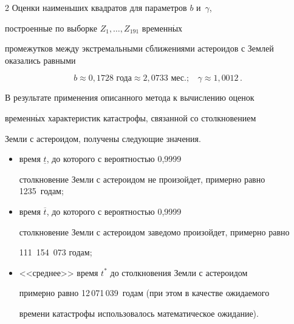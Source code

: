 \begin{multicols}{2}
Оценки наименьших квадратов для пара\-мет\-ров $b$ и~$\gamma$,


построенные по выборке $Z_1,\ldots,Z_{191}$ временн$\acute{\mbox{ы}}$х


промежутков между экстремальными сближениями астероидов с Землей оказались равными


$$


b\approx 0{,}1728 \mbox{ года}\approx 2{,}0733 \mbox{ мес.};\ \ \ \


\gamma\approx 1{,}0012\,.


$$











В результате применения описанного метода к вычислению оценок


временн$\acute{\mbox{ы}}$х характеристик катастрофы, связанной со столкновением


Земли с астероидом, получены следующие значения.


\begin{itemize}


\item


время $\underline t$, до которого с вероятностью 0,9999


столкновение Земли с астероидом не про\-изойдет, примерно равно 1235~годам;


\item время $\overline t$, до которого с вероятностью 0,9999


столкновение Земли с астероидом заведомо произойдет, примерно равно


111~154~073 годам;


\item <<среднее>> время $t^*$ до столкновения Земли с астероидом


примерно равно 12\,071\,039~годам (при этом в качестве ожидаемого


времени катастрофы использовалось математическое ожидание).


\end{itemize}





\vspace*{-12pt}





{\small\frenchspacing


}
\end{multicols}
